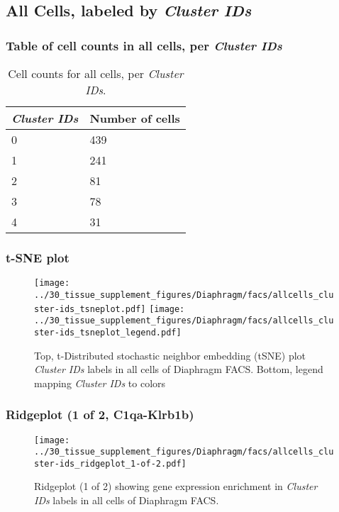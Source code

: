 \clearpage

\subsection{All Cells, labeled by \emph{Cluster IDs}}
\subsubsection{Table of cell counts in all cells, per \emph{Cluster IDs}}\begin{table}[h]
\centering
\label{my-label}
\begin{tabular}{@{}ll@{}}
\toprule

\emph{Cluster IDs}& Number of cells \\ \midrule
0 & 439 \\

1 & 241 \\

2 & 81 \\

3 & 78 \\

4 & 31 \\
\bottomrule
\end{tabular}
\caption{Cell counts for all cells, per \emph{Cluster IDs}.}
\end{table}

\clearpage
\subsubsection{t-SNE plot}
\begin{figure}[h]
\centering
\texttt{[image: ../30\_tissue\_supplement\_figures/Diaphragm/facs/allcells\_cluster-ids\_tsneplot.pdf]}
\texttt{[image: ../30\_tissue\_supplement\_figures/Diaphragm/facs/allcells\_cluster-ids\_tsneplot\_legend.pdf]}
\caption{Top, t-Distributed stochastic neighbor embedding (tSNE) plot  \emph{Cluster IDs} labels in all cells of Diaphragm FACS. Bottom, legend mapping \emph{Cluster IDs} to colors}
\end{figure}


\clearpage

\subsubsection{Ridgeplot (1 of 2, C1qa-Klrb1b)}
\begin{figure}[h]
\centering
\texttt{[image: ../30\_tissue\_supplement\_figures/Diaphragm/facs/allcells\_cluster-ids\_ridgeplot\_1-of-2.pdf]}

\caption{ Ridgeplot (1 of 2)  showing gene expression enrichment in \emph{Cluster IDs} labels in all cells of Diaphragm FACS. }
\end{figure}


